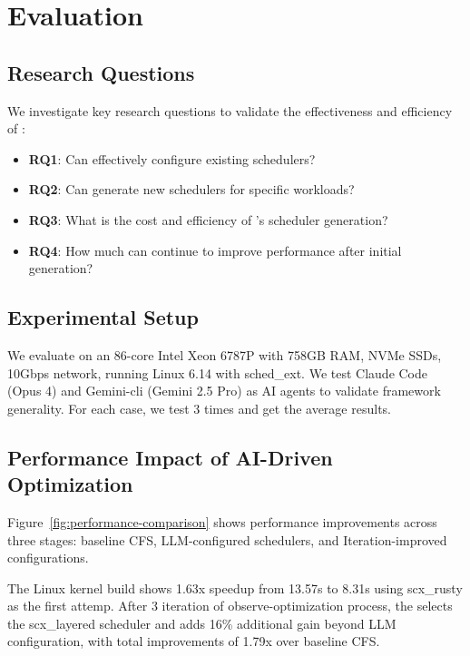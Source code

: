 \section{Evaluation}
\label{sec:evaluation}

\subsection{Research Questions}

We investigate key research questions to validate the effectiveness and efficiency of \sys:

\begin{itemize}
\item \textbf{RQ1}: Can \sys effectively configure existing schedulers?
\item \textbf{RQ2}: Can \sys generate new schedulers for specific workloads?
\item \textbf{RQ3}: What is the cost and efficiency of \sys's scheduler generation?
\item \textbf{RQ4}: How much can \agent continue to improve performance after initial generation?
\end{itemize}

\subsection{Experimental Setup}

We evaluate \sys on an 86-core Intel Xeon 6787P with 758GB RAM, NVMe SSDs, 10Gbps network, running Linux 6.14 with sched\_ext. We test Claude Code (Opus 4) and Gemini-cli (Gemini 2.5 Pro) as AI agents to validate framework generality. For each case, we test 3 times and get the average results.

\subsection{Performance Impact of AI-Driven Optimization}

Figure~\ref{fig:performance-comparison} shows performance improvements across three stages: baseline CFS, LLM-configured schedulers, and Iteration-improved configurations. 


The Linux kernel build shows 1.63x speedup from 13.57s to 8.31s using scx\_rusty as the first attemp. After 3 iteration of observe-optimization process, the \agent selects the scx\_layered scheduler and adds 16\% additional gain beyond LLM configuration, with total improvements of 1.79x over baseline CFS.

